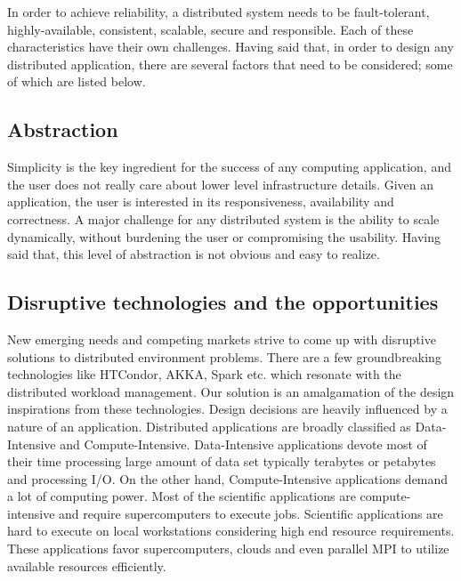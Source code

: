 \documentclass[sigconf]{acmart}
\begin{document}
In order to achieve reliability, a distributed system needs to be fault-tolerant, highly-available, consistent, scalable, secure and responsible. Each of these characteristics have their own challenges. Having said that, in order to design any distributed application, there are several factors that need to be considered; some of which are listed below.

\subsection{Abstraction}
Simplicity is the key ingredient for the success of any computing application, and the user does not really care about lower level infrastructure details. Given an application, the user is interested in its responsiveness, availability and correctness. A major challenge for any distributed system is the ability to scale dynamically, without burdening the user or compromising the usability. Having said that, this level of abstraction is not obvious and easy to realize. 

\subsection{Disruptive technologies and the opportunities}
New emerging needs and competing markets strive to come up with disruptive solutions to distributed environment problems. There are a few groundbreaking technologies like HTCondor, AKKA, Spark etc. which resonate with the distributed workload management. Our solution is an amalgamation of the design inspirations from these technologies. Design decisions are heavily influenced by a nature of an application. Distributed applications are broadly classified as Data-Intensive and Compute-Intensive. Data-Intensive applications devote most of their time processing large amount of data set typically terabytes or petabytes and processing I/O. On the other hand, Compute-Intensive applications demand a lot of computing power. Most of the scientific applications are compute-intensive and require supercomputers to execute jobs. Scientific applications are hard to execute on local workstations considering high end resource requirements. These applications favor supercomputers, clouds and even parallel MPI to utilize available resources efficiently.
\end{document}

